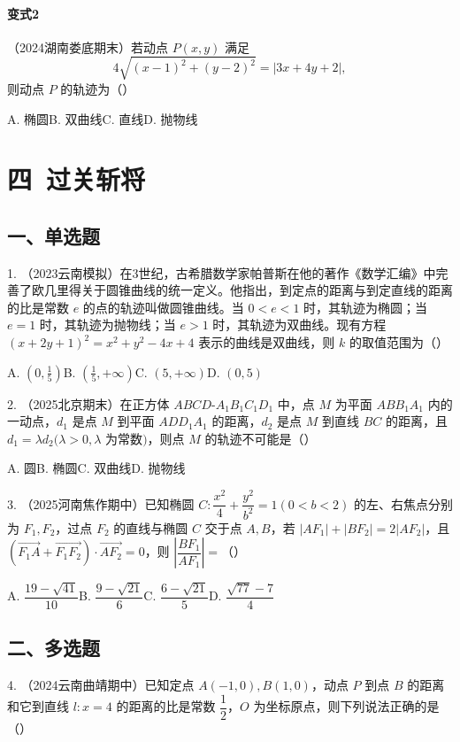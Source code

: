 \documentclass[UTF8,a4paper,11pt]{ctexart}
\begin{document}
\paragraph{变式2}（2024湖南娄底期末）若动点 $P(x,y)$ 满足
\[
4\sqrt{(x-1)^2+(y-2)^2}=|3x+4y+2|,
\]
则动点 $P$ 的轨迹为\hfill（\quad）

A. 椭圆\qquad B. 双曲线\qquad C. 直线\qquad D. 抛物线

\section*{四\ 过关斩将}

\subsection*{一、单选题}

1. （2023云南模拟）在3世纪，古希腊数学家帕普斯在他的著作《数学汇编》中完善了欧几里得关于圆锥曲线的统一定义。他指出，到定点的距离与到定直线的距离的比是常数 $e$ 的点的轨迹叫做圆锥曲线。当 $0<e<1$ 时，其轨迹为椭圆；当 $e=1$ 时，其轨迹为抛物线；当 $e>1$ 时，其轨迹为双曲线。现有方程 $(x+2y+1)^2=x^2+y^2-4x+4$ 表示的曲线是双曲线，则 $k$ 的取值范围为\hfill（\quad）

A. $(0,\frac{1}{5})$\qquad B. $(\frac{1}{5},+\infty)$\qquad C. $(5,+\infty)$\qquad D. $(0,5)$

2. （2025北京期末）在正方体 $ABCD$-$A_1B_1C_1D_1$ 中，点 $M$ 为平面 $ABB_1A_1$ 内的一动点，$d_1$ 是点 $M$ 到平面 $ADD_1A_1$ 的距离，$d_2$ 是点 $M$ 到直线 $BC$ 的距离，且 $d_1=\lambda d_2(\lambda>0,\lambda$ 为常数$)$，则点 $M$ 的轨迹不可能是\hfill（\quad）

A. 圆\qquad B. 椭圆\qquad C. 双曲线\qquad D. 抛物线

3. （2025河南焦作期中）已知椭圆 $C:\dfrac{x^2}{4}+\dfrac{y^2}{b^2}=1(0<b<2)$ 的左、右焦点分别为 $F_1,F_2$，过点 $F_2$ 的直线与椭圆 $C$ 交于点 $A,B$，若 $|AF_1|+|BF_2|=2|AF_2|$，且 $(\overrightarrow{F_1A}+\overrightarrow{F_1F_2})\cdot\overrightarrow{AF_2}=0$，则 $\left|\dfrac{BF_1}{AF_1}\right|=$\hfill（\quad）

A. $\dfrac{19-\sqrt{41}}{10}$\qquad B. $\dfrac{9-\sqrt{21}}{6}$\qquad C. $\dfrac{6-\sqrt{21}}{5}$\qquad D. $\dfrac{\sqrt{77}-7}{4}$

\subsection*{二、多选题}

4. （2024云南曲靖期中）已知定点 $A(-1,0),B(1,0)$，动点 $P$ 到点 $B$ 的距离和它到直线 $l:x=4$ 的距离的比是常数 $\dfrac{1}{2}$，$O$ 为坐标原点，则下列说法正确的是\hfill（\quad）
\end{document}
